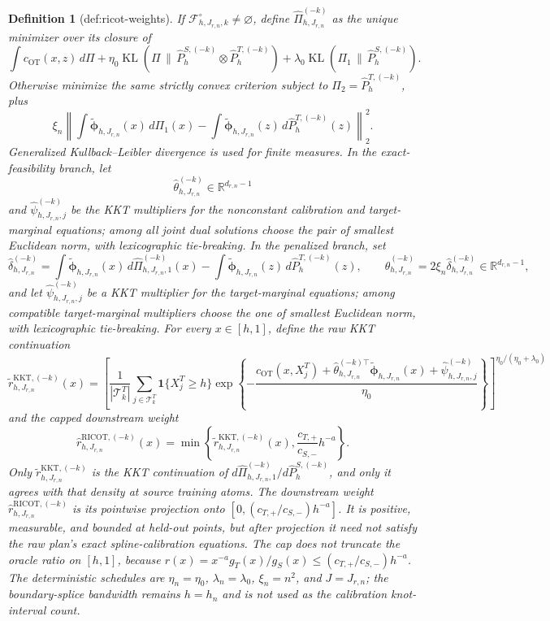 \documentclass{article}
\newtheorem{definition}{Definition}
\begin{document}
\begin{definition}[def:ricot-weights]
If \(\mathcal F^\circ_{h,J_{r,n},k}\ne\varnothing\), define \(\widehat\Pi^{(-k)}_{h,J_{r,n}}\) as the unique minimizer over its closure of
\[
\int c_{\mathrm{OT}}(x,z)\,d\Pi
+\eta_0\operatorname{KL}(\Pi\,\|\,\widehat P^{S,(-k)}_h\otimes\widehat P^{T,(-k)}_h)
+\lambda_0\operatorname{KL}(\Pi_1\,\|\,\widehat P^{S,(-k)}_h).
\]
Otherwise minimize the same strictly convex criterion subject to \(\Pi_2=\widehat P^{T,(-k)}_h\), plus
\[
\xi_n\left\|
\int\widetilde{\boldsymbol\phi}_{h,J_{r,n}}(x)\,d\Pi_1(x)
-\int\widetilde{\boldsymbol\phi}_{h,J_{r,n}}(z)\,d\widehat P^{T,(-k)}_h(z)
\right\|_2^2.
\]
Generalized Kullback--Leibler divergence is used for finite measures. In the exact-feasibility branch, let
\[
\widehat\theta^{(-k)}_{h,J_{r,n}}\in\mathbb R^{d_{r,n}-1}
\]
and \(\widehat\psi^{(-k)}_{h,J_{r,n},j}\) be the KKT multipliers for the nonconstant calibration and target-marginal equations; among all joint dual solutions choose the pair of smallest Euclidean norm, with lexicographic tie-breaking. In the penalized branch, set
\[
\widehat\delta^{(-k)}_{h,J_{r,n}}=
\int\widetilde{\boldsymbol\phi}_{h,J_{r,n}}(x)\,d\widehat\Pi^{(-k)}_{h,J_{r,n},1}(x)
-\int\widetilde{\boldsymbol\phi}_{h,J_{r,n}}(z)\,d\widehat P^{T,(-k)}_h(z),
\qquad
\widehat\theta^{(-k)}_{h,J_{r,n}}=2\xi_n\widehat\delta^{(-k)}_{h,J_{r,n}}
\in\mathbb R^{d_{r,n}-1},
\]
and let \(\widehat\psi^{(-k)}_{h,J_{r,n},j}\) be a KKT multiplier for the target-marginal equations; among compatible target-marginal multipliers choose the one of smallest Euclidean norm, with lexicographic tie-breaking. For every \(x\in[h,1]\), define the raw KKT continuation
\[
\widetilde r^{\mathrm{KKT},(-k)}_{h,J_{r,n}}(x)=
\left[
\frac1{|\mathcal T^T_k|}\sum_{j\in\mathcal T^T_k}\mathbf 1\{X_j^T\ge h\}
\exp\left\{-\frac{c_{\mathrm{OT}}(x,X_j^T)
+\widehat\theta_{h,J_{r,n}}^{(-k)\top}\widetilde{\boldsymbol\phi}_{h,J_{r,n}}(x)
+\widehat\psi^{(-k)}_{h,J_{r,n},j}}{\eta_0}\right\}
\right]^{\eta_0/(\eta_0+\lambda_0)}
\]
and the capped downstream weight
\[
\widehat r^{\mathrm{RICOT},(-k)}_{h,J_{r,n}}(x)
=\min\left\{\widetilde r^{\mathrm{KKT},(-k)}_{h,J_{r,n}}(x),\frac{c_{T,+}}{c_{S,-}}h^{-a}\right\}.
\]
Only \(\widetilde r^{\mathrm{KKT},(-k)}_{h,J_{r,n}}\) is the KKT continuation of \(d\widehat\Pi^{(-k)}_{h,J_{r,n},1}/d\widehat P^{S,(-k)}_h\), and only it agrees with that density at source training atoms. The downstream weight \(\widehat r^{\mathrm{RICOT},(-k)}_{h,J_{r,n}}\) is its pointwise projection onto \([0,(c_{T,+}/c_{S,-})h^{-a}]\). It is positive, measurable, and bounded at held-out points, but after projection it need not satisfy the raw plan's exact spline-calibration equations. The cap does not truncate the oracle ratio on \([h,1]\), because \(r(x)=x^{-a}g_T(x)/g_S(x)\le(c_{T,+}/c_{S,-})h^{-a}\). The deterministic schedules are \(\eta_n=\eta_0\), \(\lambda_n=\lambda_0\), \(\xi_n=n^2\), and \(J=J_{r,n}\); the boundary-splice bandwidth remains \(h=h_n\) and is not used as the calibration knot-interval count.


\end{definition}
\end{document}
